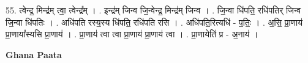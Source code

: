 \documentclass[17pt]{extarticle}
\begin{document}
55. त्वेन्द्र॒ मिन्द्र॑म् त्वा॒ त्वेन्द्र᳚म् । . इन्द्र॑म् जिन्व जि॒न्वेन्द्र॒ मिन्द्र॑म् जिन्व । . जि॒न्वा धि॑पति॒ रधि॑पतिर् जिन्व जि॒न्वा धि॑पतिः । . अधि॑पति रस्य॒स्य धि॑पति॒ रधि॑पति रसि । . अधि॑पति॒रित्यधि॑ - प॒तिः॒ । . अ॒सि॒ प्रा॒णाय॑ प्रा॒णाया᳚स्यसि प्रा॒णाय॑ । . प्रा॒णाय॑ त्वा त्वा प्रा॒णाय॑ प्रा॒णाय॑ त्वा । . प्रा॒णायेति॑ प्र - अ॒नाय॑ । \newline

\textbf{Ghana Paata } \newline
\end{document}
